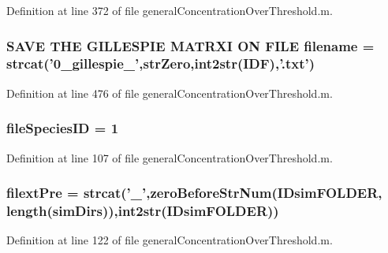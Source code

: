 Definition at line 372 of file general\-Concentration\-Over\-Threshold.\-m.

\hypertarget{a00028_a3982f974d3baf0c73223616526999bed}{
\subsubsection[{filename}]{\setlength{\rightskip}{0pt plus 5cm}S\-A\-V\-E T\-H\-E G\-I\-L\-L\-E\-S\-P\-I\-E M\-A\-T\-R\-X\-I O\-N F\-I\-L\-E filename = strcat('0\-\_\-gillespie\-\_\-',str\-Zero,int2str(\-I\-D\-F),'.\-txt')}}\label{a00028_a3982f974d3baf0c73223616526999bed}


Definition at line 476 of file general\-Concentration\-Over\-Threshold.\-m.

\hypertarget{a00028_aac959c2e94c26a03fa03966f9cec127e}{
\subsubsection[{file\-Species\-I\-D}]{\setlength{\rightskip}{0pt plus 5cm}file\-Species\-I\-D = 1}}\label{a00028_aac959c2e94c26a03fa03966f9cec127e}


Definition at line 107 of file general\-Concentration\-Over\-Threshold.\-m.

\hypertarget{a00028_a527736a425f4f7ead2c2dc9d7b479346}{
\subsubsection[{filext\-Pre}]{\setlength{\rightskip}{0pt plus 5cm}filext\-Pre = strcat('\-\_\-',zero\-Before\-Str\-Num({\bf I\-Dsim\-F\-O\-L\-D\-E\-R}, length({\bf sim\-Dirs})),int2str({\bf I\-Dsim\-F\-O\-L\-D\-E\-R}))}}\label{a00028_a527736a425f4f7ead2c2dc9d7b479346}


Definition at line 122 of file general\-Concentration\-Over\-Threshold.\-m.

